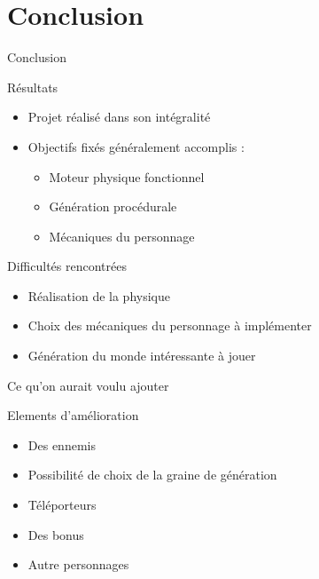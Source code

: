 \documentclass{beamer}
\begin{document}
{\section{Conclusion}
\begin{frame}{Conclusion}
    \begin{block}{R\'esultats}
        \begin{itemize}
            \item[\bullet] Projet réalisé dans son intégralité
            \item[\bullet] Objectifs fixés généralement accomplis :
            \begin{itemize}
                \item[\rightarrow] Moteur physique fonctionnel
                \item[\rightarrow] Génération procédurale
                \item[\rightarrow] Mécaniques du personnage
            \end{itemize}
        \end{itemize}
    \end{block}
    \begin{block}{Difficultés rencontrées}
        \begin{itemize}
            \item[\bullet] Réalisation de la physique
            \item[\bullet] Choix des mécaniques du personnage à implémenter
            \item[\bullet] Génération du monde intéressante à jouer
        \end{itemize}
    \end{block}
\end{frame}

\begin{frame}{Ce qu'on aurait voulu ajouter}
    \begin{block}{Elements d'amélioration}
        \begin{itemize}
          \item[\bullet] Des ennemis
          \item[\bullet] Possibilité de choix de la graine de génération
          \item[\bullet] Téléporteurs
          \item[\bullet] Des bonus
          \item[\bullet] Autre personnages
        \end{itemize}
    \end{block}
\end{frame}

}
\end{document}
